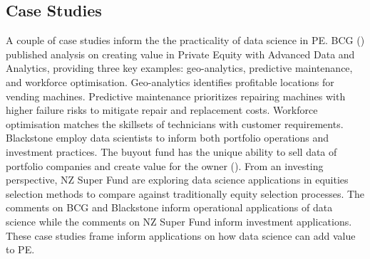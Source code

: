 \documentclass[12pt]{article}
\begin{document}
\subsection{Case Studies}\label{cs}
A couple of case studies inform the the practicality of data science in PE. 
BCG (\citeyear{BCG}) published analysis on creating value in Private Equity with Advanced Data and Analytics, providing three key examples: geo-analytics, predictive maintenance, and workforce optimisation.
Geo-analytics identifies profitable locations for vending machines.
Predictive maintenance prioritizes repairing machines with higher failure risks to mitigate repair and replacement costs.
Workforce optimisation matches the skillsets of technicians with customer requirements.
Blackstone employ data scientists to inform both portfolio operations and investment practices. 
The buyout fund has the unique ability to sell data of portfolio companies and create value for the owner (\cite{BBBS}).
From an investing perspective, NZ Super Fund are exploring data science applications in equities selection methods to compare against traditionally equity selection processes.
The comments on BCG and Blackstone inform operational applications of data science while the comments on NZ Super Fund inform investment applications. 
These case studies frame inform applications on how data science can add value to PE.
\end{document}
